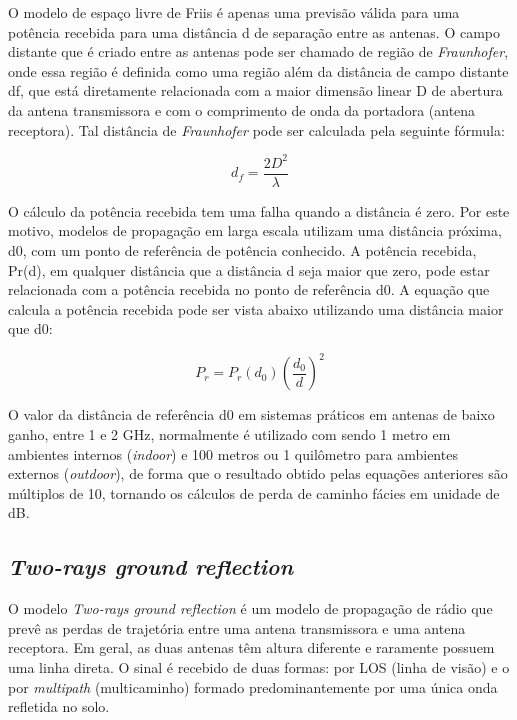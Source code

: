 \documentclass[
	12pt,				%
	openright,			%
	twoside,			%
	a4paper,			%
	english,			%
	french,				%
	spanish,			%
	brazil				%
	]{abntex2}
\begin{document}
O modelo de espaço livre de Friis é apenas uma previsão válida para uma potência recebida para uma distância d de separação entre as antenas. O campo distante que é criado entre as antenas pode ser chamado de região de \textit{Fraunhofer}, onde essa região é definida como uma região além da distância de campo distante df, que está diretamente relacionada com a maior dimensão linear D de abertura da antena transmissora e com o comprimento de onda da portadora (antena receptora). Tal distância de \textit{Fraunhofer} pode ser calculada pela seguinte fórmula:


\begin{equation}
	d_{f} =  \frac{2D^{2}}{\lambda}
\end{equation}

O cálculo da potência recebida tem uma falha quando a distância é zero. Por este motivo, modelos de propagação em larga escala utilizam uma distância próxima, d0, com um ponto de referência de potência conhecido. A potência recebida, Pr(d), em qualquer distância que a distância d seja maior que zero, pode estar relacionada com a potência recebida no ponto de referência d0. A equação que calcula a potência recebida pode ser vista abaixo utilizando uma distância maior que d0:


\begin{equation}
P_{r} = P_{r}(d_{0})(\frac{d_{0}}{d})^{2}
\end{equation}

O valor da distância de referência d0 em sistemas práticos em antenas de baixo ganho, entre 1 e 2 GHz, normalmente é utilizado com sendo 1 metro em ambientes internos (\textit{indoor}) e 100 metros ou 1 quilômetro para ambientes externos (\textit{outdoor}), de forma que o resultado obtido pelas equações anteriores são múltiplos de 10, tornando os cálculos de perda de caminho fácies em unidade de dB.

\subsection[Two-rays ground reflection]{\textit{Two-rays ground reflection}}

O modelo \textit{Two-rays ground reflection} é um modelo de propagação de rádio que prevê as perdas de trajetória entre uma antena transmissora e uma antena receptora. Em geral, as duas antenas têm altura diferente e raramente possuem uma linha direta. O sinal é recebido de duas formas: por LOS (linha de visão) e o por \textit{multipath} (multicaminho) formado predominantemente por uma única onda refletida no solo.
\end{document}
